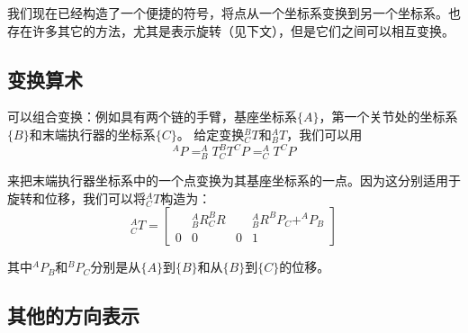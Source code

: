 我们现在已经构造了一个便捷的符号，将点从一个坐标系变换到另一个坐标系。也存在许多其它的方法，尤其是表示旋转（见下文），但是它们之间可以相互变换。

\subsection{变换算术}

可以组合变换：例如具有两个链的手臂，基座坐标系$\{A\}$，第一个关节处的坐标系$\{B\}$和末端执行器的坐标系$\{C\}$。 给定变换$^B_CT$和$^A_BT$，我们可以用
\begin{equation}
^AP=^A_BT^B_CT^CP=^A_CT^CP
\end{equation}

来把末端执行器坐标系中的一个点变换为其基座坐标系的一点。因为这分别适用于旋转和位移，我们可以将$^A_CT$构造为：
\begin{equation}
^A_CT=\left[\begin{array}{ccc|c} & ^A_BR^B_CR & & ^A_BR^BP_C +^AP_B \\\hline 0 & 0 & 0 & 1\end{array}\right]
\end{equation}
%

其中$^AP_B$和$^BP_C$分别是从$\{A\}$到$\{B\}$和从$\{B\}$到$\{C\}$的位移。

\subsection{其他的方向表示}


